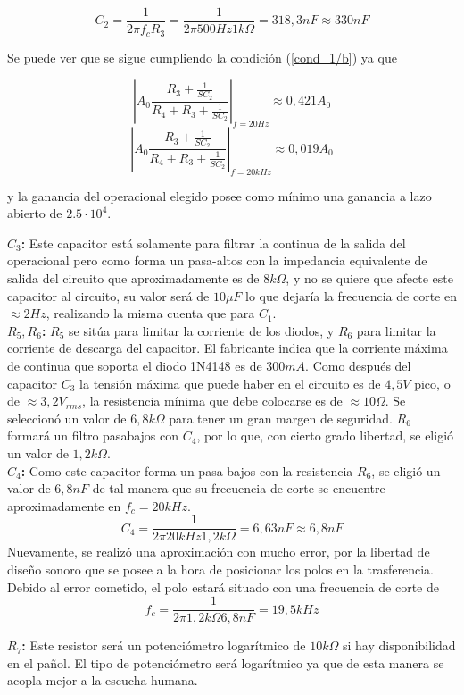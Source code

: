 \[ C_2 = \frac{1}{2\pi f_c R_3} = \frac{1}{2\pi 500Hz 1k\Omega} = 318,3nF \approx 330nF \]

Se puede ver que se sigue cumpliendo la condición (\ref{cond_1/b}) ya que

$$ \left| A_{0}\frac{R_3 + \frac{1}{SC_2}}{R_4 + R_3 + \frac{1}{SC_2}} \right|_{f=20Hz} \approx 0,421A_0 $$
$$ \left| A_{0}\frac{R_3 + \frac{1}{SC_2}}{R_4 + R_3 + \frac{1}{SC_2}} \right|_{f=20kHz} \approx 0,019A_0 $$

y la ganancia del operacional elegido posee como mínimo una ganancia a lazo abierto de $2.5 \cdot 10^4$.

\textbf{$C_3$:} Este capacitor está solamente para filtrar la continua de la salida del operacional pero como forma un pasa-altos con la impedancia equivalente de salida del circuito que aproximadamente es de $8k\Omega$, y no se quiere que afecte este capacitor al circuito, su valor será de $10\mu F$ lo que dejaría la frecuencia de corte en $\approx 2Hz$, realizando la misma cuenta que para $C_1$.\\

\textbf{$R_5, R_6$:} $R_5$ se sitúa para limitar la corriente de los diodos, y $R_6$ para limitar la corriente de descarga del capacitor. El fabricante indica que la corriente máxima de continua que soporta el diodo 1N4148 es de $300mA$. Como después del capacitor $C_3$ la tensión máxima que puede haber en el circuito es de $4,5V$ pico, o de $\approx 3,2V_{rms}$, la resistencia mínima que debe colocarse es de $\approx 10\Omega$. Se seleccionó un valor de $6,8k\Omega$ para tener un gran margen de seguridad. $R_6$ formará un filtro pasabajos con $C_4$, por lo que, con cierto grado libertad, se eligió un valor de $1,2k\Omega$.\\

\textbf{$C_4$:} Como este capacitor forma un pasa bajos con la resistencia $R_6$, se eligió un valor de $6,8nF$ de tal manera que su frecuencia de corte se encuentre aproximadamente en $f_c = 20kHz$.
\[ C_4 = \frac{1}{2\pi 20kHz 1,2k\Omega} = 6,63nF \approx 6,8nF\]
Nuevamente, se realizó una aproximación con mucho error, por la libertad de diseño sonoro que se posee a la hora de posicionar los polos en la trasferencia. Debido al error cometido, el polo estará situado con una frecuencia de corte de $$ f_c = \frac{1}{2\pi 1,2k\Omega 6,8nF} = 19,5kHz $$

\textbf{$R_7$:} Este resistor será un potenciómetro logarítmico de $10k\Omega$ si hay disponibilidad en el pañol. El tipo de potenciómetro será logarítmico ya que de esta manera se acopla mejor a la escucha humana.\\

